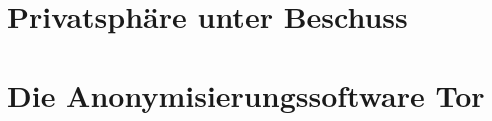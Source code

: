 \documentclass{beamer}
\begin{document}
\section{Privatsphäre unter Beschuss}

\begin{frame}
\end{frame}

\section{Die Anonymisierungssoftware Tor}

\begin{frame}
\end{frame}
\end{document}
